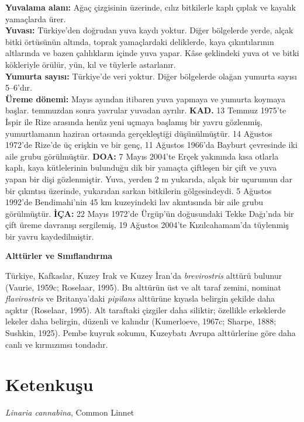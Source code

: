 \documentclass[
  10.5pt,
  a4paper,
  DIV=11,
  numbers=noendperiod,
  twocolumn]{scrreprt}
\begin{document}
\textbf{Yuvalama alanı:} Ağaç çizgisinin üzerinde, cılız bitkilerle
kaplı çıplak ve kayalık yamaçlarda ürer.\\
\textbf{Yuvası:} Türkiye'den doğrudan yuva kaydı yoktur. Diğer
bölgelerde yerde, alçak bitki örtüsünün altında, toprak yamaçlardaki
deliklerde, kaya çıkıntılarının altlarında ve bazen çalılıkların içinde
yuva yapar. Kâse şeklindeki yuva ot ve bitki kökleriyle örülür, yün, kıl
ve tüylerle astarlanır.\\
\textbf{Yumurta sayısı:} Türkiye'de veri yoktur. Diğer bölgelerde olağan
yumurta sayısı 5--6'dır.\\
\textbf{Üreme dönemi:} Mayıs ayından itibaren yuva yapmaya ve yumurta
koymaya başlar. temmuzdan sonra yavrular yuvadan ayrılır. \textbf{KAD.}
13 Temmuz 1975'te İspir ile Rize arasında henüz yeni uçmaya başlamış bir
yavru gözlenmiş, yumurtlamanın haziran ortasında gerçekleştiği
düşünülmüştür. 14 Ağustos 1972'de Rize'de üç erişkin ve bir genç, 11
Ağustos 1966'da Bayburt çevresinde iki aile grubu görülmüştür.
\textbf{DOA:} 7 Mayıs 2004'te Erçek yakınında kısa otlarla kaplı, kaya
kütlelerinin bulunduğu dik bir yamaçta çiftleşen bir çift ve yuva yapan
bir dişi gözlenmiştir. Yuva, yerden 2 m yukarıda, alçak bir uçurumun dar
bir çıkıntısı üzerinde, yukarıdan sarkan bitkilerin gölgesindeydi. 5
Ağustos 1992'de Bendimahi'nin 45 km kuzeyindeki lav akıntısında bir aile
grubu görülmüştür. \textbf{İÇA:} 22 Mayıs 1972'de Ürgüp'ün doğusundaki
Tekke Dağı'nda bir çift üreme davranışı sergilemiş, 19 Ağustos 2004'te
Kızılcahamam'da tüylenmiş bir yavru kaydedilmiştir.

\textbf{Alttürler ve Sınıflandırma}

Türkiye, Kafkaslar, Kuzey Irak ve Kuzey İran'da \emph{brevirostris}
alttürü bulunur (Vaurie, 1959c; Roselaar, 1995). Bu alttürün üst ve alt
taraf zemini, nominat \emph{flavirostris} ve Britanya'daki
\emph{pipilans} alttürüne kıyasla belirgin şekilde daha açıktır
(Roselaar, 1995). Alt taraftaki çizgiler daha siliktir; özellikle
erkeklerde lekeler daha belirgin, düzenli ve kalındır (Kumerloeve,
1967c; Sharpe, 1888; Sushkin, 1925). Pembe kuyruk sokumu, Kuzeybatı
Avrupa alttürlerine göre daha canlı ve kırmızımsı tondadır.

\section{Ketenkuşu}\label{ketenkuux15fu}

\emph{Linaria cannabina}, Common Linnet
\end{document}
